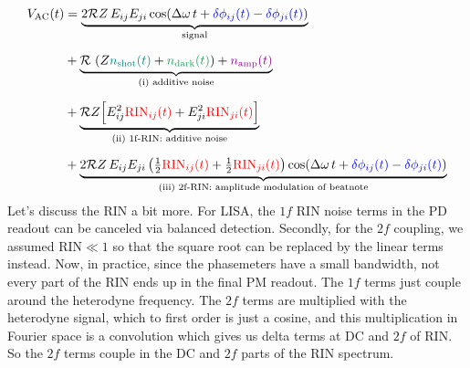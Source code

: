 \documentclass[11pt]{article}
\begin{document}
\begin{align*}
    V_\text{AC}(t) &= \underbrace{2\mathcal{R} Z \, E_{ij} E_{ji}
    \cos(\Delta\omega\, t + {\color{blue}\delta\phi_{ij}(t)} - {\color{blue}\delta\phi_{ji}(t)})}_{\text{signal}}\\[6pt]
    &+ \underbrace{\mathcal{R}  \,\left(Z{\color{teal}n_\text{shot}(t)}+{\color{ForestGreen}n_\text{dark}(t)}\right) + {\color{violet}n_\text{amp}(t)}}_{\text{(i) additive noise}}\\[6pt]
    &+ \underbrace{\mathcal{R}Z\Big[E_{ij}^2{\color{red}\text{RIN}_{ij}(t)} + E_{ji}^2{\color{red}\text{RIN}_{ji}(t)}\Big]}_{\text{(ii) 1f-RIN: additive noise}}\\[6pt]
    &+ \underbrace{2\mathcal{R} Z \, E_{ij} E_{ji}
    \left(\tfrac{1}{2}{\color{red}\text{RIN}_{ij}(t)} + \tfrac{1}{2}{\color{red}\text{RIN}_{ji}(t)}\right)
    \cos(\Delta\omega\, t + {\color{blue}\delta\phi_{ij}(t)} - {\color{blue}\delta\phi_{ji}(t)})}_{\text{(iii) 2f-RIN: amplitude modulation of beatnote}}
\end{align*}
\noindent
Let's discuss the RIN a bit more. For LISA, the $1f$ RIN noise terms in the PD readout can be canceled via balanced detection. Secondly, for the $2f$ coupling, we assumed $\text{RIN} \ll 1$ so that the square root can be replaced by the linear terms instead. Now, in practice, since the phasemeters have a small bandwidth, not every part of the RIN ends up in the final PM readout. The $1f$ terms just couple around the heterodyne frequency. The $2f$ terms are multiplied with the heterodyne signal, which to first order is just a cosine, and this multiplication in Fourier space is a convolution which gives us delta terms at DC and $2f$ of $\text{RIN}$. So the $2f$ terms couple in the DC and $2f$ parts of the $\text{RIN}$ spectrum. 
\end{document}
